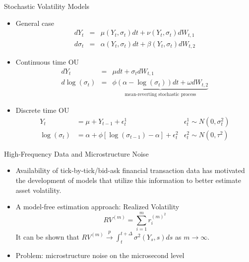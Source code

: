 \documentclass{beamer}
\begin{document}
\begin{frame}{Stochastic Volatility Models}
\begin{itemize}
		\item General case
		\begin{eqnarray*}
			dY_t &=& \mu(Y_t, \sigma_t)dt + \nu(Y_t, \sigma_t)dW_{t,1} \\
			d\sigma_t &=& \alpha(Y_t, \sigma_t)dt + \beta(Y_t, \sigma_t)dW_{t,2}
		\end{eqnarray*}
%
%
		\item Continuous time OU
%
		\begin{eqnarray*}
			d Y_t &=& \mu dt + \sigma_t dW_{t,1} \\
			d \log( \sigma_t ) &=& \underbrace{ \phi(\alpha - \log(\sigma_t))dt + \omega dW_{t,2} }_{\mbox{mean-reverting stochastic process}}
		\end{eqnarray*}
%
		\item Discrete time OU
%		
		\begin{align*}
			Y_t 			&= \mu + Y_{t-1} + \epsilon_t^1 								 & \epsilon_t^1 \sim N(0, \sigma_t^2) \\
			\log(\sigma_t) &= \alpha + \phi \left[ \log(\sigma_{t-1}) - \alpha \right] + \epsilon_t^2  & \epsilon_t^2 \sim N(0, \tau^2)
		\end{align*}
%
	\end{itemize}


\end{frame}



\begin{frame}{High-Frequency Data and Microstructure Noise}
	\begin{itemize}
		\item Availability of tick-by-tick/bid-ask financial transaction data has motivated the development of models that utilize this information to better estimate asset volatility. 
		
		\item A model-free estimation approach: Realized Volatility
				\[ RV^{(m)} = \sum_{i=1}^m r_i^{(m)^2} \]
	It can be shown that $RV^{(m)} \xrightarrow{p} \int_t^{t+\Delta} \sigma^2(Y_s, s)ds$ as $m \to \infty$.

		\item Problem: microstructure noise on the microsecond level
	\end{itemize}
\end{frame}
\end{document}
